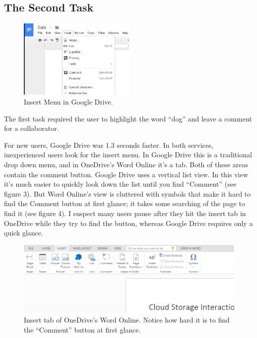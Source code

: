 \documentclass[a4paper,12pt]{article}
\begin{document}
\subsection{The Second Task}

\begin{figure}
\centering
\includegraphics[width=0.5\textwidth]{drivecomment}
\caption{Insert Menu in Google Drive.}
\end{figure}

The first task required the user to highlight the word ``dog'' and leave a comment for a collaborator.

For new users, Google Drive was 1.3 seconds faster. In both services, inexperienced users look for the insert menu. In Google Drive this is a traditional drop down menu, and in OneDrive's Word Online it's a tab. Both of these areas contain the comment button. Google Drive uses a vertical list view. In this view it's much easier to quickly look down the list until you find ``Comment'' (see figure 3). But Word Online's view is cluttered with symbols that make it hard to find the Comment button at first glance; it takes some searching of the page to find it (see figure 4).  I suspect many users pause after they hit the insert tab in OneDrive while they try to find the button, whereas Google Drive requires only a quick glance.


\begin{figure}[h]
\centering
\includegraphics[width=\textwidth]{onedrivecomment}
\caption{Insert tab of OneDrive's Word Online. Notice how hard it is to find the ``Comment'' button at first glance.}
\end{figure}
\end{document}

